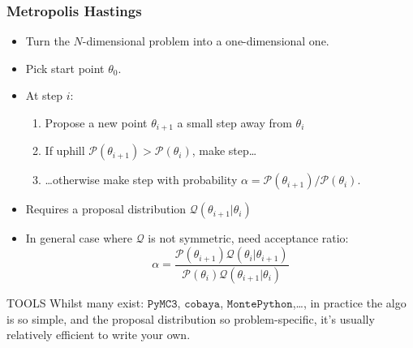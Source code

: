 \documentclass[aspectratio=169]{beamer}
\begin{document}
\begin{frame}
    \frametitle{Metropolis Hastings} 
    \begin{itemize}
        \item Turn the $N$-dimensional problem into a one-dimensional one.
        \item Pick start point $\theta_0$.
        \item At step $i$:
            \begin{enumerate}
                \item Propose a new point $\theta_{i+1}$ a small step away from $\theta_{i}$
                \item If uphill $\mathcal{P}(\theta_{i+1}) > \mathcal{P}(\theta_i)$, make step\ldots
                \item \ldots otherwise make step with probability $\alpha = \mathcal{P}(\theta_{i+1}) / \mathcal{P}(\theta_i)$. 
            \end{enumerate}
        \item Requires a proposal distribution $\mathcal{Q}(\theta_{i+1}|\theta_i)$
        \item In general case where $\mathcal{Q}$ is not symmetric, need acceptance ratio:
            \begin{equation*}
                \alpha = \frac{\mathcal{P}(\theta_{i+1})\mathcal{Q}(\theta_{i}|\theta_{i+1})}{\mathcal{P}(\theta_{i})\mathcal{Q}(\theta_{i+1}|\theta_{i})}
            \end{equation*}
    \end{itemize}
    \begin{block}{TOOLS}
        Whilst many exist: $\texttt{PyMC3}$, $\texttt{cobaya}$, $\texttt{MontePython}$,\ldots, in practice the algo is so simple, and the proposal distribution so problem-specific, it's usually relatively efficient to write your own.
    \end{block}
\end{frame}
\end{document}
